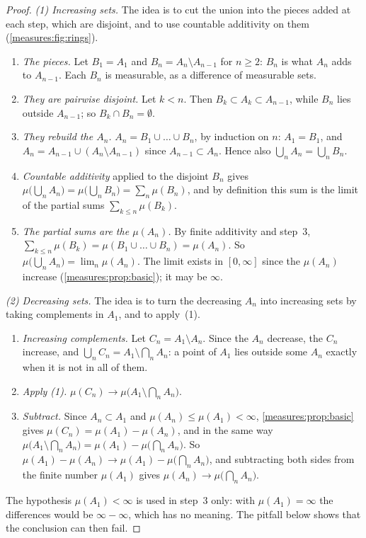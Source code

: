 \begin{notechapter}
\begin{proof}
\emph{(1) Increasing sets.} The idea is to cut the union into the
pieces added at each step, which are disjoint, and to use countable
additivity on them (\cref{measures:fig:rings}).
\begin{enumerate}[nosep]
  \item \emph{The pieces.} Let $B_1 = A_1$ and
        $B_n = A_n\setminus A_{n-1}$ for $n\geq2$: $B_n$ is what $A_n$
        adds to $A_{n-1}$. Each $B_n$ is measurable, as a difference of
        measurable sets.
  \item \emph{They are pairwise disjoint.} Let $k < n$. Then
        $B_k\subset A_k\subset A_{n-1}$, while $B_n$ lies outside
        $A_{n-1}$; so $B_k\cap B_n = \emptyset$.
  \item \emph{They rebuild the $A_n$.} $A_n = B_1\cup\dots\cup B_n$, by
        induction on $n$: $A_1 = B_1$, and
        $A_n = A_{n-1}\cup(A_n\setminus A_{n-1})$ since
        $A_{n-1}\subset A_n$. Hence also
        $\bigcup_nA_n = \bigcup_nB_n$.
  \item \emph{Countable additivity} applied to the disjoint $B_n$ gives
        $\mu\bigl(\bigcup_nA_n\bigr) = \mu\bigl(\bigcup_nB_n\bigr)
        = \sum_n\mu(B_n)$, and by definition this sum is the limit of
        the partial sums $\sum_{k\leq n}\mu(B_k)$.
  \item \emph{The partial sums are the $\mu(A_n)$.} By finite
        additivity and step~3,
        $\sum_{k\leq n}\mu(B_k) = \mu(B_1\cup\dots\cup B_n) = \mu(A_n)$.
        So $\mu\bigl(\bigcup_nA_n\bigr) = \lim_n\mu(A_n)$. The limit
        exists in $[0, \infty]$ since the $\mu(A_n)$ increase
        (\cref{measures:prop:basic}); it may be $\infty$.
\end{enumerate}
\emph{(2) Decreasing sets.} The idea is to turn the decreasing $A_n$
into increasing sets by taking complements in $A_1$, and to apply~(1).
\begin{enumerate}[nosep]
  \item \emph{Increasing complements.} Let $C_n = A_1\setminus A_n$.
        Since the $A_n$ decrease, the $C_n$ increase, and
        $\bigcup_nC_n = A_1\setminus\bigcap_nA_n$: a point of $A_1$ lies
        outside some $A_n$ exactly when it is not in all of them.
  \item \emph{Apply (1).} $\mu(C_n)\to\mu\bigl(A_1\setminus
        \bigcap_nA_n\bigr)$.
  \item \emph{Subtract.} Since $A_n\subset A_1$ and
        $\mu(A_n)\leq\mu(A_1) < \infty$, \cref{measures:prop:basic}
        gives $\mu(C_n) = \mu(A_1) - \mu(A_n)$, and in the same way
        $\mu\bigl(A_1\setminus\bigcap_nA_n\bigr) = \mu(A_1) -
        \mu\bigl(\bigcap_nA_n\bigr)$. So
        $\mu(A_1) - \mu(A_n)\to\mu(A_1) - \mu\bigl(\bigcap_nA_n\bigr)$,
        and subtracting both sides from the finite number $\mu(A_1)$
        gives $\mu(A_n)\to\mu\bigl(\bigcap_nA_n\bigr)$.
\end{enumerate}
The hypothesis $\mu(A_1) < \infty$ is used in step~3 only: with
$\mu(A_1) = \infty$ the differences would be $\infty - \infty$, which
has no meaning. The pitfall below shows that the conclusion can then
fail.
\end{proof}


\end{notechapter}
